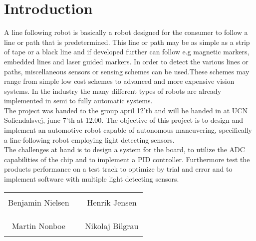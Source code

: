 \chapter*{Introduction}


A line following robot is basically a robot designed for the consumer to follow a line or path that is predetermined. This line or path may be as simple as a strip of tape or a black line and if  developed further can follow e.g magnetic markers, embedded lines and laser guided markers. In order to detect the various lines or paths, miscellaneous sensors or sensing schemes can be used.\newline These schemes may range from simple low cost schemes to advanced and more expensive vision systems. In the industry the many different types of robots are already implemented in semi to fully automatic systems.\\

The project was handed to the group april 12'th and will be handed in at UCN Sofiendalsvej, june 7'th at 12.00.\newline
The objective of this project is to design and implement an automotive robot capable of autonomous maneuvering, specifically a line-following robot employing light detecting sensors.  \\
The challenges at hand is to design a system for the board, to utilize the ADC capabilities of the chip and to implement a PID controller. Furthermore test the products performance on a test track to optimize by trial and error and to implement software with multiple light detecting sensors.


%
\phantom{Luft}\vspace{3cm}
\begin{table}[H]
	\centering
		\begin{tabular}{c c c}
			\underline{\phantom{JAERJAERJAERJAERGO}} & \phantom{cookies} & \underline{\phantom{JAERJAERJAERJAERGO}} \\
			Benjamin Nielsen			& \phantom{cookies} & Henrik Jensen		\\
			&&\\
			&&\\
			\underline{\phantom{JAERJAERJAERJAERGO}} & \phantom{cookies} & \underline{\phantom{JAERJAERJAERJAERGO}} \\
			Martin Nonboe			& \phantom{cookies} & Nikolaj Bilgrau		\\
			&&\\
						
		\end{tabular}
\end{table}